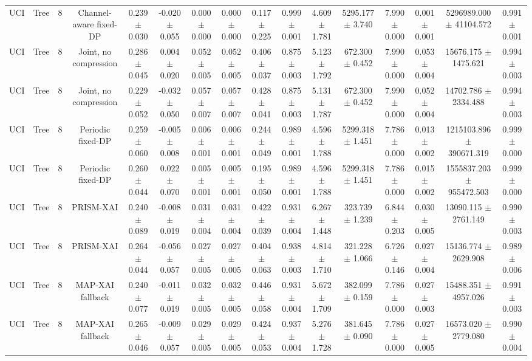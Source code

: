 \begin{tabular}{lccccccccccccccc}
UCI & Tree & 8 & Channel-aware fixed-DP & 0.239 $\pm$ 0.030 & -0.020 $\pm$ 0.055 & 0.000 $\pm$ 0.000 & 0.000 $\pm$ 0.000 & 0.117 $\pm$ 0.225 & 0.999 $\pm$ 0.001 & 4.609 $\pm$ 1.781 & 5295.177 $\pm$ 3.740 & 7.990 $\pm$ 0.000 & 0.001 $\pm$ 0.001 & 5296989.000 $\pm$ 41104.572 & 0.991 $\pm$ 0.001 \\
UCI & Tree & 8 & Joint, no compression & 0.286 $\pm$ 0.045 & 0.004 $\pm$ 0.020 & 0.052 $\pm$ 0.005 & 0.052 $\pm$ 0.005 & 0.406 $\pm$ 0.037 & 0.875 $\pm$ 0.003 & 5.123 $\pm$ 1.792 & 672.300 $\pm$ 0.452 & 7.990 $\pm$ 0.000 & 0.053 $\pm$ 0.004 & 15676.175 $\pm$ 1475.621 & 0.994 $\pm$ 0.003 \\
UCI & Tree & 8 & Joint, no compression & 0.229 $\pm$ 0.052 & -0.032 $\pm$ 0.050 & 0.057 $\pm$ 0.007 & 0.057 $\pm$ 0.007 & 0.428 $\pm$ 0.041 & 0.875 $\pm$ 0.003 & 5.131 $\pm$ 1.787 & 672.300 $\pm$ 0.452 & 7.990 $\pm$ 0.000 & 0.052 $\pm$ 0.004 & 14702.786 $\pm$ 2334.488 & 0.994 $\pm$ 0.003 \\
UCI & Tree & 8 & Periodic fixed-DP & 0.259 $\pm$ 0.060 & -0.005 $\pm$ 0.008 & 0.006 $\pm$ 0.001 & 0.006 $\pm$ 0.001 & 0.244 $\pm$ 0.049 & 0.989 $\pm$ 0.001 & 4.596 $\pm$ 1.788 & 5299.318 $\pm$ 1.451 & 7.786 $\pm$ 0.000 & 0.013 $\pm$ 0.002 & 1215103.896 $\pm$ 390671.319 & 0.999 $\pm$ 0.000 \\
UCI & Tree & 8 & Periodic fixed-DP & 0.260 $\pm$ 0.044 & 0.022 $\pm$ 0.070 & 0.005 $\pm$ 0.001 & 0.005 $\pm$ 0.001 & 0.195 $\pm$ 0.050 & 0.989 $\pm$ 0.001 & 4.596 $\pm$ 1.788 & 5299.318 $\pm$ 1.451 & 7.786 $\pm$ 0.000 & 0.015 $\pm$ 0.002 & 1555837.203 $\pm$ 955472.503 & 0.999 $\pm$ 0.000 \\
UCI & Tree & 8 & PRISM-XAI & 0.240 $\pm$ 0.089 & -0.008 $\pm$ 0.019 & 0.031 $\pm$ 0.004 & 0.031 $\pm$ 0.004 & 0.422 $\pm$ 0.039 & 0.931 $\pm$ 0.004 & 6.267 $\pm$ 1.448 & 323.739 $\pm$ 1.239 & 6.844 $\pm$ 0.203 & 0.030 $\pm$ 0.005 & 13090.115 $\pm$ 2761.149 & 0.990 $\pm$ 0.003 \\
UCI & Tree & 8 & PRISM-XAI & 0.264 $\pm$ 0.044 & -0.056 $\pm$ 0.057 & 0.027 $\pm$ 0.005 & 0.027 $\pm$ 0.005 & 0.404 $\pm$ 0.063 & 0.938 $\pm$ 0.003 & 4.814 $\pm$ 1.710 & 321.228 $\pm$ 1.066 & 6.726 $\pm$ 0.146 & 0.027 $\pm$ 0.004 & 15136.774 $\pm$ 2629.908 & 0.989 $\pm$ 0.006 \\
UCI & Tree & 8 & MAP-XAI fallback & 0.240 $\pm$ 0.077 & -0.011 $\pm$ 0.019 & 0.032 $\pm$ 0.005 & 0.032 $\pm$ 0.005 & 0.446 $\pm$ 0.058 & 0.931 $\pm$ 0.004 & 5.672 $\pm$ 1.709 & 382.099 $\pm$ 0.159 & 7.786 $\pm$ 0.000 & 0.027 $\pm$ 0.003 & 15488.351 $\pm$ 4957.026 & 0.991 $\pm$ 0.003 \\
UCI & Tree & 8 & MAP-XAI fallback & 0.265 $\pm$ 0.046 & -0.009 $\pm$ 0.057 & 0.029 $\pm$ 0.005 & 0.029 $\pm$ 0.005 & 0.424 $\pm$ 0.053 & 0.937 $\pm$ 0.004 & 5.276 $\pm$ 1.728 & 381.645 $\pm$ 0.090 & 7.786 $\pm$ 0.000 & 0.027 $\pm$ 0.005 & 16573.020 $\pm$ 2779.080 & 0.990 $\pm$ 0.004 \\
\bottomrule
\end{tabular}

